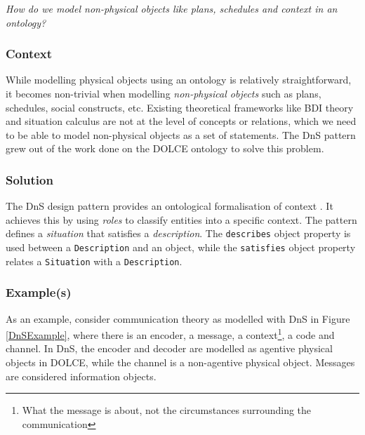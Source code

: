 \emph{How do we model non-physical objects like plans, schedules and context in an ontology?}

\subsubsection{Context}

While modelling physical objects using an ontology is relatively straightforward, it becomes non-trivial when modelling \emph{non-physical objects} \cite{Gangemi2003} such as plans, schedules, social constructs, etc. Existing theoretical frameworks like \ac{BDI} theory and situation calculus are not at the level of concepts or relations, which we need to be able to model non-physical objects as a set of statements. The \ac{DnS} pattern grew out of the work done on the \ac{DOLCE} ontology to solve this problem.



\subsubsection{Solution}

The \ac{DnS} design pattern provides an ontological formalisation of context \cite{Scherp2011}. It achieves this by using \emph{roles} to classify entities into a specific context. The pattern defines a \emph{situation} that satisfies a \emph{description}. The \texttt{describes} object property is used between a \texttt{Description} and an object, while the \texttt{satisfies} object property relates a \texttt{Situation} with a \texttt{Description}.

\subsubsection{Example(s)}



As an example, consider communication theory \cite{Shannon} as modelled with \ac{DnS} in Figure \ref{DnSExample}, where there is an encoder, a message, a context\footnote{What the message is about, not the circumstances surrounding the communication}, a code and channel. In \ac{DnS}, the encoder and decoder are modelled as agentive physical objects in \ac{DOLCE}, while the channel is a non-agentive physical object. Messages are considered information objects. 



